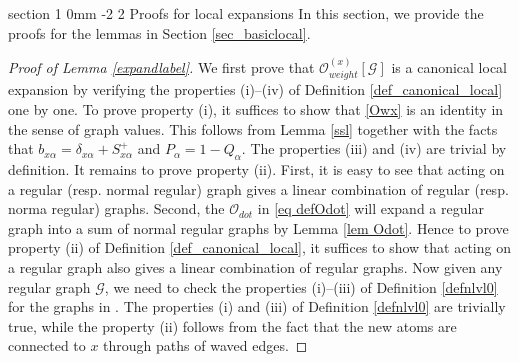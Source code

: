 \documentclass{article}
\makeatletter
\newcommand{\1}{\mathds{1}}
\numberwithin{equation}{section}
\newcommand{\al}{\alpha}
\renewcommand{\cal}{\mathcal}
\theoremstyle{plain} %
\theoremstyle{remark}
\renewcommand{\section}{\@startsection
{section}%
{1}%
{0mm}%
{-2\baselineskip}%
{2\baselineskip}%
{\normalfont\large\scshape\centering}} %
\makeatother
\begin{document}
\section{Proofs for local expansions}\label{appd localpf}
In this section, we provide the proofs for the lemmas in Section \ref{sec_basiclocal}.
\begin{proof} [Proof of Lemma \ref{expandlabel}]
We first prove that $ {\cal O}_{weight}^{(x)}[\cal G]$ is a canonical local expansion by verifying the properties (i)--(iv) of Definition \ref{def_canonical_local} one by one. To prove property (i), it suffices to show that \eqref{Owx} is an identity in the sense of graph values. This follows from Lemma \ref{ssl} together with the facts that $b_{x\al}=\delta_{x\al} + S^+_{x\al}$ and  $P_\al = 1-Q_\al$. The properties (iii) and (iv) are trivial by definition. %
It remains to prove property (ii). First, it is easy to see that \smash{${\cal O}^{(x),1}_{weight}$} acting on a regular (resp. normal regular) graph gives a linear combination of regular (resp. norma regular) graphs. Second, the $\cal O_{dot}$ in \eqref{eq defOdot} will expand a regular graph into a sum of normal regular graphs by Lemma \ref{lem Odot}. Hence to prove property (ii) of Definition \ref{def_canonical_local}, it suffices to show that \smash{$ {\cal O}^{(x), 2}_{weight}$} acting on a regular graph also gives a linear combination of regular graphs. Now given any regular graph $\cal G$, we need to check the properties (i)--(iii) of Definition \ref{defnlvl0} for the graphs in \smash{${\cal O}^{(x) ,2}_{weight} [\cal G]$}. The properties (i) and (iii) of Definition \ref{defnlvl0} are trivially true, while the property (ii) follows from the fact that the new atoms are connected to $x$ through paths of waved edges. 

\end{proof}
\end{document}
